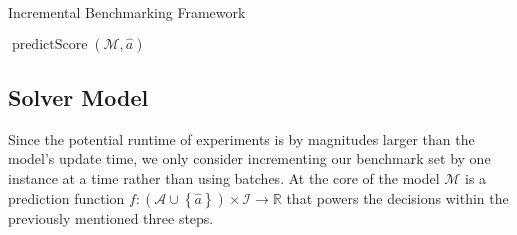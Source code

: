 \documentclass[runningheads]{llncs}
\begin{document}
\begin{algorithm}
  \caption{Incremental Benchmarking Framework}
  \label{algALBenchmark}


  \BlankLine


  
  \Return $\operatorname{predictScore}\!\left(\mathcal{M}, \hat{a}\right)$

\end{algorithm}



\subsection{Solver Model}
\label{sec:main-model}


Since the potential runtime of experiments is by magnitudes larger than the model's update time, we only consider incrementing our benchmark set by one instance at a time rather than using batches.
At the core of the model $\mathcal{M}$ is a prediction function $f\!: \left(\mathcal{A} \cup \left\lbrace \hat{a} \right\rbrace\right) \times \mathcal{I} \rightarrow \mathbb{R}$ that powers the decisions within the previously mentioned three steps.
\end{document}
